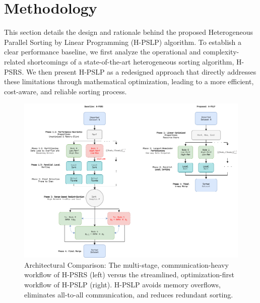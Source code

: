 \documentclass{article}
\begin{document}
\section{Methodology}
\label{sec:methodology}

This section details the design and rationale behind the proposed Heterogeneous Parallel Sorting by Linear Programming (H-PSLP) algorithm. To establish a clear performance baseline, we first analyze the operational and complexity-related shortcomings of a state-of-the-art heterogeneous sorting algorithm, H-PSRS. We then present H-PSLP as a redesigned approach that directly addresses these limitations through mathematical optimization, leading to a more efficient, cost-aware, and reliable sorting process.

\begin{figure}[H]
    \centering
    \includegraphics[width=1\linewidth]{images/workflow.png}
    \caption{Architectural Comparison: The multi-stage, communication-heavy workflow of H-PSRS (left) versus the streamlined, optimization-first workflow of H-PSLP (right). H-PSLP avoids memory overflows, eliminates all-to-all communication, and reduces redundant sorting.}
    \label{fig:workflow_comparison}
\end{figure}
\end{document}
